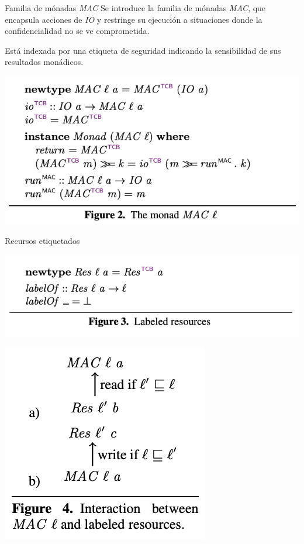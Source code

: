 \documentclass{beamer}
\begin{document}
\begin{frame}{Familia de mónadas \textit{MAC}}
    Se introduce la familia de mónadas \textit{MAC}, que encapsula acciones de \textit{IO} y restringe su ejecución a situaciones donde la confidencialidad no se ve comprometida. 

    Está indexada por una etiqueta de seguridad indicando la sensibilidad de sus resultados monádicos. 

    \begin{center}
        \includegraphics[scale=0.7]{figure2.png}
    \end{center}
\end{frame}

\begin{frame}{Recursos etiquetados}
    
    \begin{center}
        \includegraphics[scale=0.7]{figure3.png}
    \end{center}

    \begin{center}
        \includegraphics[scale=0.7]{figure4.png}
    \end{center}
\end{frame}
\end{document}
